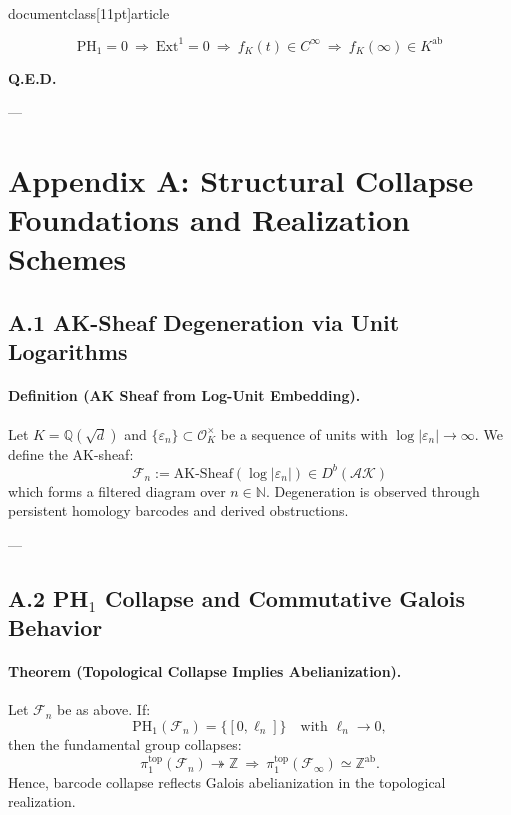 \\documentclass[11pt]{article}
\begin{document}
\[
\boxed{
\mathrm{PH}_1 = 0 \ \Rightarrow\ \mathrm{Ext}^1 = 0 \ \Rightarrow\ f_K(t) \in C^\infty \ \Rightarrow\ f_K(\infty) \in K^{\mathrm{ab}}
}
\]

\begin{center}
\LARGE \textbf{Q.E.D.}
\end{center}


---


\appendix
\section*{Appendix A: Structural Collapse Foundations and Realization Schemes}

\subsection*{A.1 AK-Sheaf Degeneration via Unit Logarithms}

\paragraph{Definition (AK Sheaf from Log-Unit Embedding).}
Let \( K = \mathbb{Q}(\sqrt{d}) \) and \( \{ \varepsilon_n \} \subset \mathcal{O}_K^\times \) be a sequence of units with \( \log|\varepsilon_n| \to \infty \).  
We define the AK-sheaf:
\[
\mathcal{F}_n := \mathrm{AK}\text{-}\mathrm{Sheaf}(\log|\varepsilon_n|) \in D^b(\mathcal{AK})
\]
which forms a filtered diagram over \( n \in \mathbb{N} \).  
Degeneration is observed through persistent homology barcodes and derived obstructions.

---

\subsection*{A.2 PH$_1$ Collapse and Commutative Galois Behavior}

\paragraph{Theorem (Topological Collapse Implies Abelianization).}
Let \( \mathcal{F}_n \) be as above. If:
\[
\mathrm{PH}_1(\mathcal{F}_n) = \{[0, \ell_n]\} \quad \text{with } \ell_n \to 0,
\]
then the fundamental group collapses:
\[
\pi_1^{\mathrm{top}}(\mathcal{F}_n) \twoheadrightarrow \mathbb{Z} \ \Rightarrow\ \pi_1^{\mathrm{top}}(\mathcal{F}_\infty) \simeq \mathbb{Z}^{\mathrm{ab}}.
\]
Hence, barcode collapse reflects Galois abelianization in the topological realization.
\end{document}
